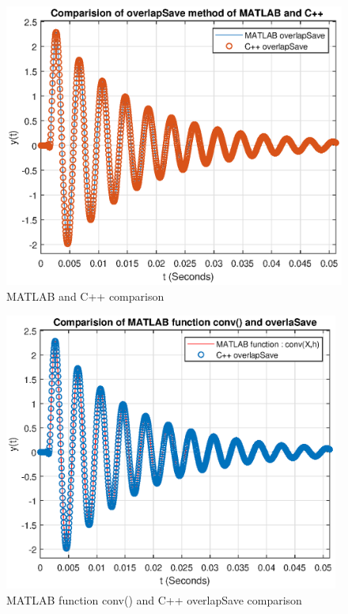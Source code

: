 \begin{figure}[h]
	\centering
	\includegraphics[width=12cm]{./algorithms/overlap_save/figures/sinusoid_with_exponent_matlab_and_C++.eps}
	\caption{MATLAB and C++ comparison}\label{sinusoid_with_exponent_matlab_and_C++}
\end{figure}

\begin{figure}[h]
	\centering
	\includegraphics[width=11cm]{./algorithms/overlap_save/figures/sinusoid_with_exponent_conv_and_C++.eps}
	\caption{MATLAB function conv() and C++ overlapSave comparison}\label{sinusoid_with_exponent_conv_and_C++}
\end{figure}

\newpage
